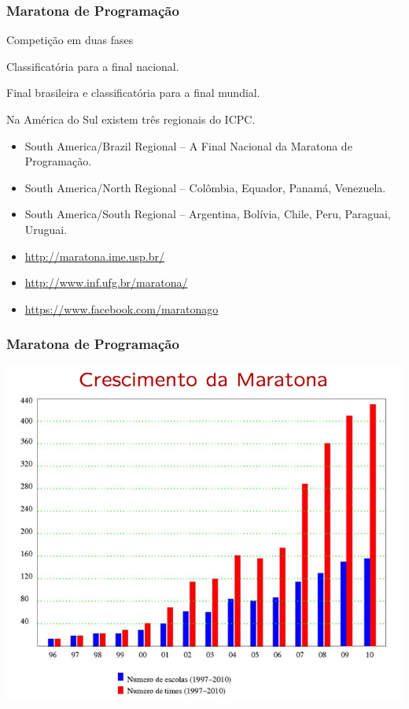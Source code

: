 \begin{frame}
\frametitle{Maratona de Programação}
\begin{block}{Competição em duas fases}
\begin{description}
	\item [Regional] Classificatória para a final nacional.
	\item [Nacional] Final brasileira e classificatória para a final mundial.
\end{description}
\end{block}

\begin{block}{}
\small Na América do Sul existem três regionais do ICPC. 
\begin{itemize}
	\item \small South America/Brazil Regional -- A Final Nacional da Maratona de Programação.
	\item \small South America/North Regional -- Colômbia, Equador, Panamá, Venezuela.
	\item \small South America/South Regional -- Argentina, Bolívia, Chile, Peru, Paraguai, Uruguai.
\end{itemize}

\end{block}

\begin{block}{}
\begin{itemize}
	\item \url{http://maratona.ime.usp.br/}
	\item \url{http://www.inf.ufg.br/maratona/}
	\item \url{https://www.facebook.com/maratonago}
\end{itemize}
\end{block}
\end{frame}

\begin{frame}
\frametitle{Maratona de Programação}
\begin{center}
	\includegraphics[width=.75\textwidth]{figuras/crescbrsl.png}
\end{center}
\end{frame}

